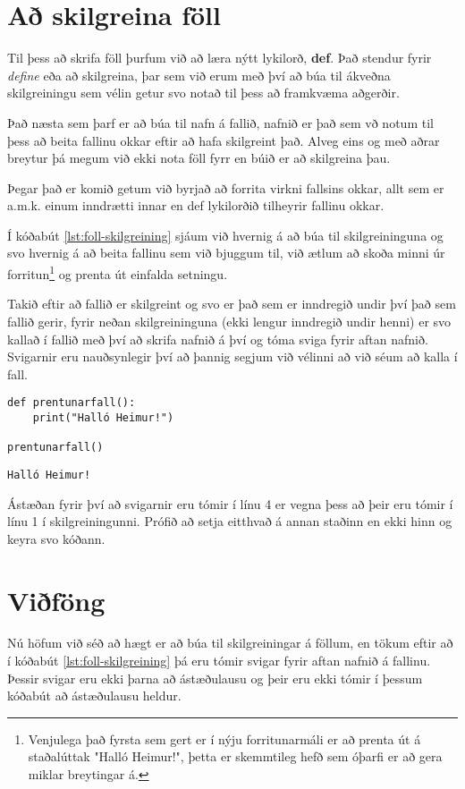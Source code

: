 \section{Að skilgreina föll}
Til þess að skrifa föll þurfum við að læra nýtt lykilorð, \textbf{def}.
Það stendur fyrir \emph{define} eða að skilgreina, þar sem við erum með því að búa til ákveðna skilgreiningu sem vélin getur svo notað til þess að framkvæma aðgerðir.

Það næsta sem þarf er að búa til nafn á fallið, nafnið er það sem vð notum til þess að beita fallinu okkar eftir að hafa skilgreint það.
Alveg eins og með aðrar breytur þá megum við ekki nota föll fyrr en búið er að skilgreina þau.

Þegar það er komið getum við byrjað að forrita virkni fallsins okkar, allt sem er a.m.k. einum inndrætti innar en def lykilorðið tilheyrir fallinu okkar.

Í kóðabút \ref{lst:foll-skilgreining} sjáum við hvernig á að búa til skilgreininguna og svo hvernig á að beita fallinu sem við bjuggum til, við ætlum að skoða minni úr forritun\footnote{Venjulega það fyrsta sem gert er í nýju forritunarmáli er að prenta út á staðalúttak "Halló Heimur!", þetta er skemmtileg hefð sem óþarfi er að gera miklar breytingar á.} og prenta út einfalda setningu.

Takið eftir að fallið er skilgreint og svo er það sem er inndregið undir því það sem fallið gerir, fyrir neðan skilgreininguna (ekki lengur inndregið undir henni) er svo kallað í fallið með því að skrifa nafnið á því og tóma sviga fyrir aftan nafnið.
Svigarnir eru nauðsynlegir því að þannig segjum við vélinni að við séum að kalla í fall.

\begin{lstlisting}[caption=Föll skilgreind, label=lst:foll-skilgreining]
def prentunarfall():
	print("Halló Heimur!")

prentunarfall()
\end{lstlisting}
\lstset{style=uttak}
\begin{lstlisting}
Halló Heimur!
\end{lstlisting}
\lstset{style=venjulegt}

Ástæðan fyrir því að svigarnir eru tómir í línu 4 er vegna þess að þeir eru tómir í línu 1 í skilgreiningunni.
Prófið að setja eitthvað á annan staðinn en ekki hinn og keyra svo kóðann.

\section{Viðföng}
Nú höfum við séð að hægt er að búa til skilgreiningar á föllum, en tökum eftir að í kóðabút \ref{lst:foll-skilgreining} þá eru tómir svigar fyrir aftan nafnið á fallinu.
Þessir svigar eru ekki þarna að ástæðulausu og þeir eru ekki tómir í þessum kóðabút að ástæðulausu heldur.

